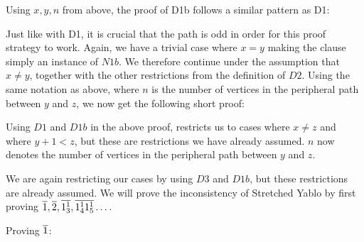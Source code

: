 Using $x,y,n$ from above, the proof of D1b follows a similar pattern as D1:
\begin{prooftree*}
\end{prooftree*}
Just like with D1, it is crucial that the path is odd in order for this proof strategy to work.
Again, we have a trivial case where $x = y$ making the clause simply an instance of $N1b$.
We therefore continue under the assumption that $x \neq y$, together with the other restrictions from the definition of $D2$.
Using the same notation as above, where $n$ is the number of vertices in the peripheral path between $y$ and $z$, we now get the following short proof:
\begin{prooftree*}
\end{prooftree*}
Using $D1$ and $D1b$ in the above proof, restricts us to cases where $x \neq z$ and where $y+1 < z$, but these are restrictions we have already assumed.
$n$ now denotes the number of vertices in the peripheral path between $y$ and $z$.
\begin{prooftree*}
\end{prooftree*}
We are again restricting our cases by using $D3$ and $D1b$, but these restrictions are already assumed.
We will prove the inconsistency of Stretched Yablo by first proving $\ol{1},\ol{2},\ol{1^1_3},\ol{1^1_4}\ol{1^1_5}\dots$.

Proving $\ol{1}$:
\begin{prooftree*}
  \Hypo{\dots}
\end{prooftree*}

